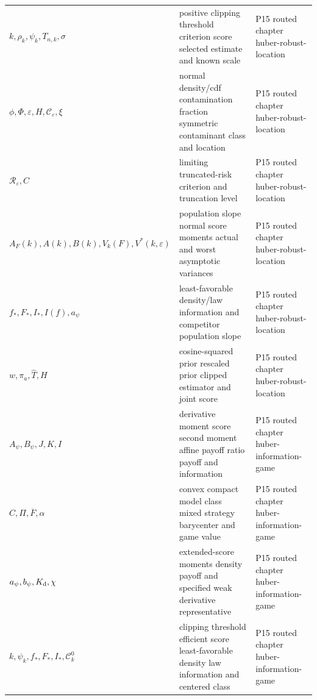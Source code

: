 \begin{longtable}{@{}p{}p{}p{}@{}}
\(k,\allowbreak \rho_k,\allowbreak \psi_k,\allowbreak T_{n,k},\allowbreak \sigma\) & positive clipping threshold criterion score selected estimate and known scale & P15 routed chapter huber-\allowbreak{}robust-\allowbreak{}location \\
\(\phi,\allowbreak \Phi,\allowbreak \varepsilon,\allowbreak H,\allowbreak \mathcal C_\varepsilon,\allowbreak \xi\) & normal density/cdf contamination fraction symmetric contaminant class and location & P15 routed chapter huber-\allowbreak{}robust-\allowbreak{}location \\
\(\mathcal R_\varepsilon,\allowbreak C\) & limiting truncated-risk criterion and truncation level & P15 routed chapter huber-\allowbreak{}robust-\allowbreak{}location \\
\(A_F(k),\allowbreak A(k),\allowbreak B(k),\allowbreak V_k(F),\allowbreak V^*(k,\allowbreak \varepsilon)\) & population slope normal score moments actual and worst asymptotic variances & P15 routed chapter huber-\allowbreak{}robust-\allowbreak{}location \\
\(f_*,\allowbreak F_*,\allowbreak I_*,\allowbreak I(f),\allowbreak a_\psi\) & least-favorable density/law information and competitor population slope & P15 routed chapter huber-\allowbreak{}robust-\allowbreak{}location \\
\(w,\allowbreak \pi_a,\allowbreak \widehat T,\allowbreak H\) & cosine-squared prior rescaled prior clipped estimator and joint score & P15 routed chapter huber-\allowbreak{}robust-\allowbreak{}location \\
\(A_\psi,\allowbreak B_\psi,\allowbreak J,\allowbreak K,\allowbreak I\) & derivative moment score second moment affine payoff ratio payoff and information & P15 routed chapter huber-\allowbreak{}information-\allowbreak{}game \\
\(C,\allowbreak \Pi,\allowbreak \overline F,\allowbreak \alpha\) & convex compact model class mixed strategy barycenter and game value & P15 routed chapter huber-\allowbreak{}information-\allowbreak{}game \\
\(a_\psi,\allowbreak b_\psi,\allowbreak K_{\rm d},\allowbreak \chi\) & extended-score moments density payoff and specified weak derivative representative & P15 routed chapter huber-\allowbreak{}information-\allowbreak{}game \\
\(k,\allowbreak \psi_k,\allowbreak f_*,\allowbreak F_*,\allowbreak I_*,\allowbreak \mathcal C_k^0\) & clipping threshold efficient score least-favorable density law information and centered class & P15 routed chapter huber-\allowbreak{}information-\allowbreak{}game \\

\end{longtable}
